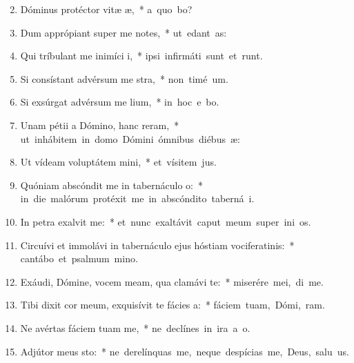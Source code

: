 \begin{flushleft}
\begin{enumerate}[leftmargin=*]
\setcounter{enumi}{1}

\item Dóminus protéctor vitæ æ,~* \mbox{a quo bo?}
\item Dum apprópiant super me notes,~* \mbox{ut edant  as:}
\item Qui tríbulant me inimíci i,~* \mbox{ipsi infirmáti sunt et runt.}
\item Si consístant advérsum me stra,~* \mbox{non timé  um.}
\item Si exsúrgat advérsum me lium,~* \mbox{in hoc e bo.}
\item Unam pétii a Dómino, hanc reram,~* \mbox{ut inhábitem in domo Dómini ómnibus diébus  æ:}
\item Ut vídeam voluptátem mini,~* \mbox{et vísitem  jus.}
\item Quóniam abscóndit me in tabernáculo o:~* \mbox{in die malórum protéxit me in abscóndito taberná i.}
\item In petra exalvit me:~* \mbox{et nunc exaltávit caput meum super ini os.}
\item Circuívi et immolávi in tabernáculo ejus hóstiam vociferatinis:~* \mbox{cantábo et psalmum  mino.}
\item Exáudi, Dómine, vocem meam, qua clamávi  te:~* \mbox{miserére mei,  di me.}
\item Tibi dixit cor meum, exquisívit te fácies a:~* \mbox{fáciem tuam, Dómi, ram.}
\item Ne avértas fáciem tuam  me,~* \mbox{ne declínes in ira a  o.}
\item Adjútor meus sto:~* \mbox{ne derelínquas me, neque despícias me, Deus, salu us.}

\end{enumerate}
\end{flushleft}
